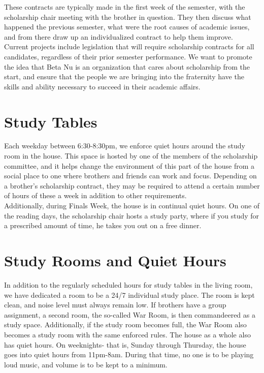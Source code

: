 These contracts are typically made in the first week of the semester, with the scholarship chair meeting with the brother in question. They then discuss what happened the previous semester, what were the root causes of academic issues, and from there draw up an individualized contract to help them improve.\\

Current projects include legislation that will require scholarship contracts for all candidates, regardless of their prior semester performance. We want to promote the idea that Beta Nu is an organization that cares about scholarship from the start, and ensure that the people we are bringing into the fraternity have the skills and ability necessary to succeed in their academic affairs.  
    
  \section*{Study Tables}
    Each weekday between 6:30-8:30pm, we enforce quiet hours around the study room in the house. This space is hosted by one of the members of the scholarship committee, and it helps change the environment of this part of the house from a social place to one where brothers and friends can work and focus. Depending on a brother’s scholarship contract, they may be required to attend a certain number of hours of these a week in addition to other requirements.\\

	Additionally, during Finals Week, the house is in continual quiet hours. On one of the reading days, the scholarship chair hosts a study party, where if you study for a prescribed amount of time, he takes you out on a free dinner.
    
  \section*{Study Rooms and Quiet Hours}
   	In addition to the regularly scheduled hours for study tables in the living room, we have dedicated a room to be a 24/7 individual study place. The room is kept clean, and noise level must always remain low. If brothers have a group assignment, a second room, the so-called War Room, is then commandeered as a study space. Additionally, if the study room becomes full, the War Room also becomes a study room with the same enforced rules. The house as a whole also has quiet hours. On weeknights- that is, Sunday through Thursday, the house goes into quiet hours from 11pm-8am. During that time, no one is to be playing loud music, and volume is to be kept to a minimum.
    
